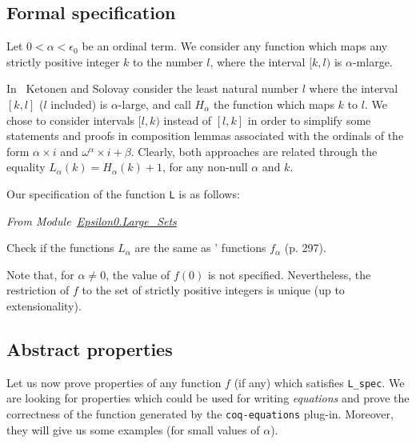 \subsection{Formal specification}


Let $0<\alpha<\epsilon_0$ be an ordinal term. We consider any  function which  maps  any strictly positive integer $k$ to the number $l$, where 
the interval $[k,l)$ is $\alpha$-mlarge.

\begin{remark}
In~\cite{KS81} Ketonen and Solovay consider the least natural number $l$ where the interval $[k,l]$ ($l$ included) is $\alpha$-large, and call $H_\alpha$ the function which maps $k$ to $l$. We chose to consider intervals $[l,k)$ instead of $[l,k]$
in order to simplify  some statements and proofs in composition lemmas associated with the ordinals of the form $\alpha\times i$ and 
$\omega^\alpha\times i + \beta$.
Clearly, both approaches are related through the equality
$L_\alpha(k)=H_\alpha(k)+1$, for any non-null $\alpha$ and $k$.
\end{remark}




Our specification of the function \texttt{L} is as follows:

\emph{From Module~\href{../theories/html/hydras.Epsilon0.Large_Sets.html}{Epsilon0.Large\_Sets}}




\begin{todo}
 Check if the functions $L_\alpha$ are the same as
\cite{KS81}' functions $f_\alpha$ (p. 297).
\end{todo}


Note that, for $\alpha\not=0$, the value of $f(0)$ is not specified.
Nevertheless, the restriction of $f$ to the set of strictly positive integers is unique (up to extensionality).




\subsection{Abstract properties}



Let us now prove properties of any function $f$ (if any) which satisfies 
\texttt{L\_spec}. We are looking for properties which could be used for writing \emph{equations} and prove the correctness of the function generated by the \texttt{coq-equations} plug-in. Moreover, they will give us some examples (for small values of $\alpha$).


